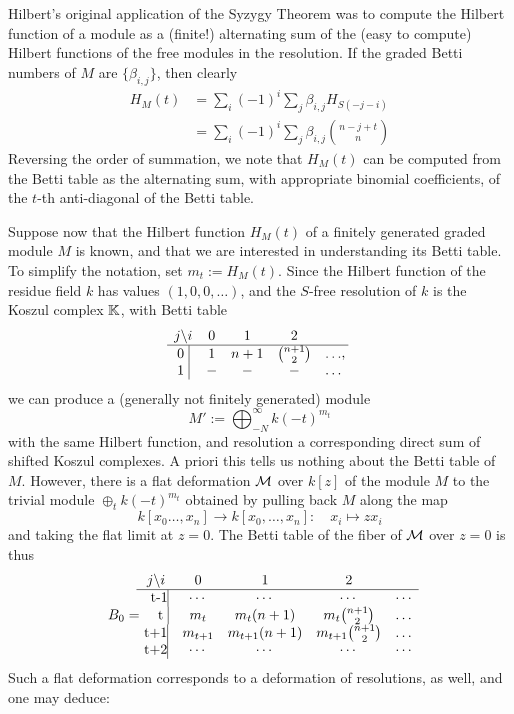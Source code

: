  Hilbert's original application of the Syzygy Theorem was to compute the Hilbert function of a module as a (finite!) alternating sum of the (easy to compute) Hilbert functions of the free modules in the resolution. If the graded Betti numbers of $M$ are $\{\beta_{i,j}\}$, then clearly
\begin{align*}
 H_{M}(t) &= \sum_{i}(-1)^{i}\sum_{j}\beta_{i,j}H_{S(-j-i)}\\
 &= \sum_{i}(-1)^{i}\sum_{j}\beta_{i,j}{n-j+t\choose n}
\end{align*}
Reversing the order of summation, we note that $H_{M}(t)$ can be computed from the Betti table as the 
alternating sum, with appropriate binomial coefficients, of the $t$-th anti-diagonal of the Betti table. 

Suppose now that the Hilbert function $H_{M}(t)$ of a finitely generated
graded module $M$ is known, and that we are interested in understanding its Betti table. To simplify the notation, set $m_{t} := H_{M}(t)$. Since the Hilbert function of the residue field $k$ has values $(1,0,0,\dots)$, and the $S$-free resolution of $k$ is the
Koszul complex ${\mathbb K}$, with Betti table
$$
\begin{matrix}
j \backslash i     &0&1&2\\ \hline
\text{0 }\vline &1&n+1&{n+1\choose 2}&\dots\\
\text{1 }\vline &-&-&-&\dots\\
\end{matrix},
$$
we can produce a (generally not finitely generated) module 
$$
M' := \bigoplus_{-N}^{\infty}k(-t)^{m_{t}}
$$
with the same Hilbert function, and resolution a corresponding direct sum of shifted Koszul complexes. 
A priori this tells us nothing about the Betti table of $M$. However,
there is a flat deformation ${\mathcal M}$ over $k[z]$ of the module $M$ to the trivial module 
$\oplus_{t}k(-t)^{m_{t}}$
obtained by pulling back $M$ along the map
$$
k[x_{0}\dots,x_{n}] \to k[x_{0},\dots,x_{n}]: \quad x_{i} \mapsto zx_{i}
$$
and taking the flat limit at $z=0$. 
The Betti table of the fiber of ${\mathcal M}$ over $z=0$ is thus
\begin{align*}
B_{0} =  \begin{matrix}
j \backslash i     &0&1&2\\ \hline
\text{\kern 5pt t-1}\vline &\cdots&\cdots&\cdots&\cdots\\
\text{ \kern 7pt t }\vline &m_{t}&m_{t}(n+1)&m_{t}{n+1\choose 2}&\dots\\
\text{t+1}\vline &m_{t+1}&m_{t+1}(n+1)&m_{t+1}{n+1\choose 2}&\dots\\
\text{t+2}\vline &\cdots&\cdots&\cdots&\cdots\\
\end{matrix}
\end{align*}
Such a flat deformation corresponds to a deformation of resolutions, as well, and one may deduce:

